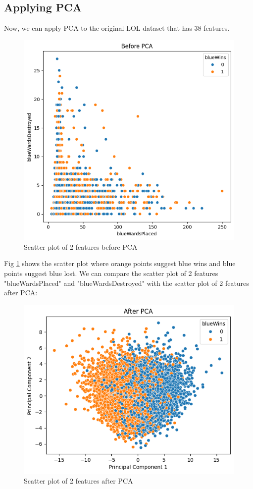 \documentclass[stu,12pt,floatsintext]{apa7}
\begin{document}
\subsection{Applying PCA}

Now, we can apply PCA to the original LOL dataset that has 38 features. 

\begin{figure}[h]
    \centering
    \includegraphics[width=0.7\linewidth]{images/scatter-before-pca.png}
    \caption{Scatter plot of 2 features before PCA}
    \label{fig:scatter-before-pca}
\end{figure}

Fig \ref{fig:scatter-before-pca} shows the scatter plot where orange points suggest blue wins and blue points suggest blue lost. We can compare the scatter plot of 2 features "blueWardsPlaced" and "blueWardsDestroyed" with the scatter plot of 2 features after PCA:

\begin{figure}[h]
    \centering
    \includegraphics[width=0.7\linewidth]{images/scatter-after-pca.png}
    \caption{Scatter plot of 2 features after PCA}
    \label{fig:scatter-after-pca}
\end{figure}
\end{document}
